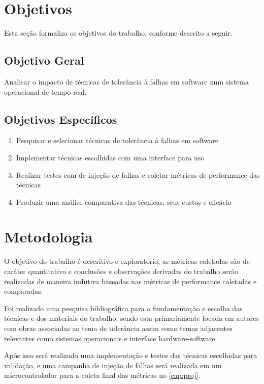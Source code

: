 \section{Objetivos}

Esta seção formaliza os objetivos do trabalho, conforme descrito a seguir.

\bigskip
\subsection{Objetivo Geral}

Analisar o impacto de técnicas de tolerância à falhas em software num sistema operacional de tempo real.

\bigskip
\subsection{Objetivos Específicos}

\begin{enumerate}
    \item Pesquisar e selecionar técnicas de tolerância à falhas em software
    \item Implementar técnicas escolhidas com uma interface para uso
    \item Realizar testes com de injeção de falhas e coletar métricas de performance das técnicas
    \item Produzir uma análise comparativa das técnicas, seus custos e eficácia
\end{enumerate}

\section{Metodologia}

O objetivo do trabalho é descritivo e exploratório, as métricas coletadas são de caráter quantitativo e conclusões e observações derivadas do trabalho serão realizadas de maneira indutiva baseadas nas métricas de performance coletadas e comparadas.

Foi realizado uma pesquisa bibliográfica para a fundamentação e escolha das técnicas e dos materiais do trabalho, sendo esta primariamente focada em autores com obras associadas ao tema de tolerância assim como temas adjacentes relevantes como sistemas operacionais e interface hardware-software.

Após isso será realizado uma implementação e testes das técnicas escolhidas para validação, e uma campanha de injeção de falhas será realizada em um microcontrolador para a coleta final das métricas no \autoref{cap:proj}.

